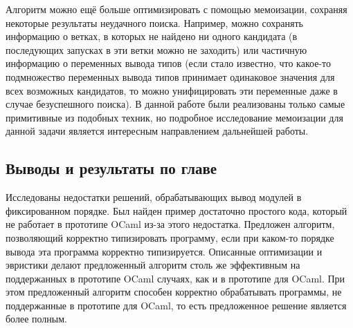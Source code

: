 \documentclass[../diploma.tex]{subfiles}
\begin{document}
Алгоритм можно ещё больше оптимизировать с помощью мемоизации, сохраняя некоторые результаты неудачного поиска. Например, можно сохранять информацию о ветках, в которых не найдено ни одного кандидата (в последующих запусках в эти ветки можно не заходить) или частичную информацию о переменных вывода типов (если стало известно, что какое-то подмножество переменных вывода типов принимает одинаковое значения для всех возможных кандидатов, то можно унифицировать эти переменные даже в случае безуспешного поиска). В данной работе были реализованы только самые примитивные из подобных техник, но подробное исследование мемоизации для данной задачи является интересным направлением дальнейшей работы.

\subsection{Выводы и результаты по главе}

Исследованы недостатки решений, обрабатывающих вывод модулей в фиксированном порядке. Был найден пример достаточно простого кода, который не работает в прототипе OCaml из-за этого недостатка. Предложен алгоритм, позволяющий корректно типизировать программу, если при каком-то порядке вывода эта программа корректно типизируется. Описанные оптимизации и эвристики делают предложенный алгоритм столь же эффективным на поддержанных в прототипе OCaml случаях, как и в прототипе для OCaml. При этом предложенный алгоритм способен корректно обрабатывать программы, не поддержанные в прототипе для OCaml, то есть предложенное решение является более полным.
\end{document}
